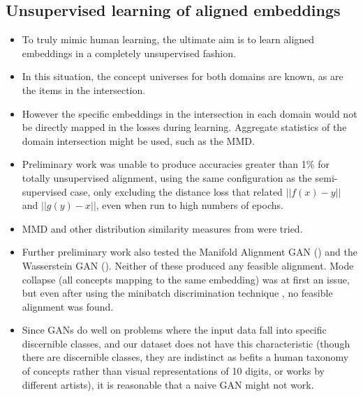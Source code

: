 \subsection{Unsupervised learning of aligned embeddings}
\begin{itemize}
    \item To truly mimic human learning, the ultimate aim is to learn aligned embeddings in a completely unsupervised fashion. 
    \item In this situation, the concept universes for both domains are known, as are the items in the intersection.
    \item However the specific embeddings in the intersection in each domain would not be directly mapped in the losses during learning. Aggregate statistics of the domain intersection might be used, such as the MMD.
    \item Preliminary work was unable to produce accuracies greater than 1\% for totally unsupervised alignment, using the same configuration as the semi-supervised case, only excluding the distance loss that related $||f(x) - y||$ and $||g(y) - x||$, even when run to high numbers of epochs. 
    \item MMD and other distribution similarity measures from \cite{torchtwosample} were tried.
    \item Further preliminary work also tested the Manifold Alignment GAN (\cite{magan}) and the Wasserstein GAN (\cite{WassersteinGAN}). Neither of these produced any feasible alignment. Mode collapse (all concepts mapping to the same embedding) was at first an issue, but even after using the minibatch discrimination technique , no feasible alignment was found. 
    \item Since GANs do well on problems where the input data fall into specific discernible classes, and our dataset does not have this characteristic (though there are discernible classes, they are indistinct as befits a human taxonomy of concepts rather than visual representations of 10 digits, or works by different artists), it is reasonable that a naive GAN might not work. 
    

\end{itemize}
